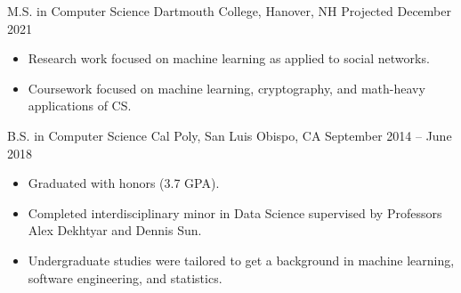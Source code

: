 \vspace{2.0mm}  %
\sffamily




\datedentry
    {M.S. in Computer Science}
    {Dartmouth College, Hanover, NH}
    {Projected December 2021}
    {}
\begin{itemize}
    \setlength{\itemindent}{-0.8em}
    \item Research work focused on machine learning as applied to social networks.
    \item Coursework focused on machine learning, cryptography, and math-heavy applications of CS.
\end{itemize}
\divider

\datedentry
    {B.S. in Computer Science}
    {Cal Poly, San Luis Obispo, CA}
    {September 2014 -- June 2018}
    {}

\begin{itemize}
    \setlength{\itemindent}{-0.8em}
    \item Graduated with honors (3.7 GPA).
    \item Completed interdisciplinary minor in Data Science supervised by Professors Alex Dekhtyar and Dennis Sun.
    \item Undergraduate studies were tailored to get a background in machine learning, software engineering, and statistics.
\end{itemize}

\medskip




\medskip


\smallskip

